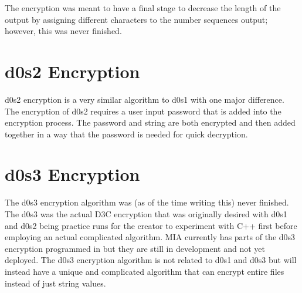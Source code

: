 The encryption was meant to have a final stage to decrease the length of the output by assigning different characters to the number sequences output; however, this was never finished.

\section{d0s2 Encryption}

d0s2 encryption is a very similar algorithm to d0s1 with one major difference. The encryption of d0s2 requires a user input password that is added into the encryption process. The password and string are both encrypted and then added together in a way that the password is needed for quick decryption.

\section{d0s3 Encryption}

The d0s3 encryption algorithm was (as of the time writing this) never finished. The d0s3 was the actual D3C encryption that was originally desired with d0s1 and d0s2 being practice runs for the creator to experiment with C++ first before employing an actual complicated algorithm. MIA currently has parts of the d0s3 encryption programmed in but they are still in development and not yet deployed. The d0s3 encryption algorithm is not related to d0s1 and d0s3 but will instead have a unique and complicated algorithm that can encrypt entire files instead of just string values.